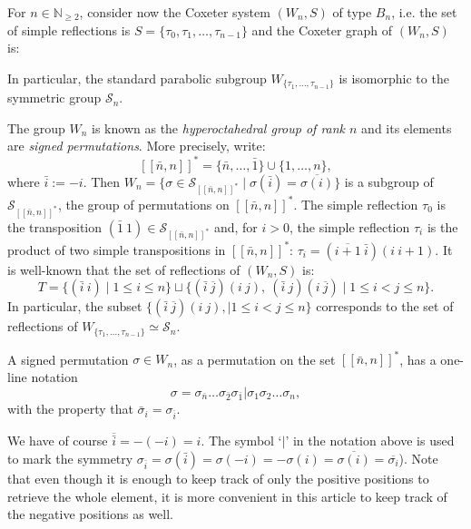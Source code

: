 \documentclass[ALCO,Unicode]{cedram}
\theoremstyle{definition}
\newcommand{\Bsetnn}{[\![\bar{n},n ]\!]^*}
\begin{document}
For $n\in\mathbb N_{\geq 2}$, consider now the Coxeter system   $(W_n, S)$ of type $B_n$, i.e.  the set of simple reflections is $S= \lbrace \tau_0, \tau_1, \dots, \tau_{n-1} \rbrace$ and the Coxeter graph of $(W_n,S)$ is: 
\begin{center}
\end{center}
In particular, the standard parabolic subgroup $W_{\{\tau_1,\dots,\tau_{n-1}\}}$ is isomorphic to the symmetric group $\mathcal S_n$. 

The group $W_n$ is known as the {\em hyperoctahedral group of rank $n$} and its elements are {\em signed permutations}. More precisely, write:
$$
\Bsetnn=\lbrace \bar n, \dots, \bar 1 \rbrace \cup \lbrace 1, \dots, n \rbrace,
$$ 
where  $\bar{i}:=-i$. Then $W_n=\{\sigma \in \mathcal S_{\Bsetnn}\mid \sigma(\bar i) = \overline{\sigma(i)}\}$ is a subgroup of  $\mathcal S_{\Bsetnn}$, the group of permutations on $\Bsetnn$. The simple reflection $\tau_0$ is the transposition $(\bar 1\ 1)\in \mathcal S_{\Bsetnn}$ and, for $i>0$, the simple reflection $\tau_i$ is the product of two simple transpositions in $\Bsetnn$: $\tau_i= (\overline{i+1}\ \bar i)(i\ i+1)$. It is well-known that the set of reflections of $(W_n,S)$ is:
$$
T=\{(\bar i \ i )\mid 1\leq i\leq n\}\sqcup\{  ( \bar i\ \overline{j})(i\ j) ,\ (\bar i\ j)(i\ \overline{j})\mid 1\leq i< j\leq n \}.
$$
In particular, the subset $\{  ( \bar i\ \overline{j})(i\ j),  \mid 1\leq i< j\leq n \}$ corresponds to the set of reflections of $W_{\{\tau_1,\dots,\tau_{n-1}\}}\simeq\mathcal S_n$. 


A signed permutation $\sigma \in W_n$, as a permutation on the set  $\Bsetnn$, has a one-line notation
$$
\sigma=\sigma_{\bar n}\dots \sigma_{\bar 2}\sigma_{\bar 1}| \sigma_1 \sigma_2\dots \sigma_n,
$$
with the property that $\bar \sigma_i = \sigma_{\bar i}$.

\begin{remark} We have of course $\overline{\bar i} = -(-i)=i$.  The symbol `$|$' in the notation above is used to mark the symmetry $\sigma_{\bar i}=\sigma(\bar i)=\sigma(-i)=-\sigma(i)=\overline{\sigma(i)}=\overline{\sigma_i}$). Note that even though it is enough to keep track of only the positive positions to retrieve the whole element, it is more convenient in this article to keep track of the negative positions as well.
\end{remark}
\end{document}
